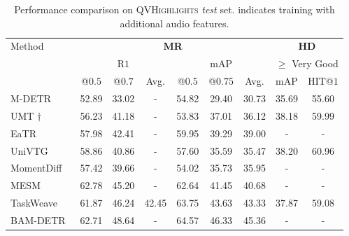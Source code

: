 \begin{table}[t]

\setlength{\tabcolsep}{0.3em}
\centering

\caption{Performance comparison on \textsc{QVHighlights} \textit{test} set. {\dag} indicates training with additional audio features.
}

\begin{small}
\setlength{\tabcolsep}{2pt}

\resizebox{\linewidth}{!}
{

    \begin{tabular}{
         l  c c c  c c c  c c
    }

    
    \toprule
    

\multirow{3}{*}{Method} & \multicolumn{6}{c}{\textbf{MR}}  & \multicolumn{2}{c}{\textbf{HD}} \\

\cmidrule(l){2-7} \cmidrule(l){8-9}

& \multicolumn{3}{c}{R$1$}  & \multicolumn{3}{c}{mAP} & \multicolumn{2}{c}{$\geq$ Very Good} \\

\cmidrule(l){2-4} \cmidrule(l){5-7} \cmidrule(l){8-9}

 & @$0.5$ & @$0.7$ & Avg. & @$0.5$ & @$0.75$ & Avg. & mAP & HIT@$1$ \\

    \midrule

M-DETR~\cite{lei2021detecting_Moment-DETR}	 & 52.89	 & 33.02	& -	 & 54.82	 & 29.40	 & 30.73	 & 35.69	 & 55.60	\\
UMT $\dagger$~\cite{liu2022umt_Umt}	 & 56.23	 & 41.18	& -	 & 53.83	 & 37.01	 & 36.12	 & 38.18	 & 59.99	\\
EaTR~\cite{jang2023knowing_EaTR}	 & 57.98	 & 42.41	& -	 & 59.95	 & 39.29	 & 39.00	& -	& -	\\
UniVTG~\cite{lin2023univtg_Univtg}	 & 58.86	 & 40.86	& -	 & 57.60	 & 35.59	 & 35.47	 & 38.20	 & 60.96	\\
MomentDiff~\cite{li2024momentdiff_momentdiff}	 & 57.42	 & 39.66	& -	 & 54.02	 & 35.73	 & 35.95	& -	& -	\\
MESM~\cite{liu2024towards_MESM}	 & 62.78	 & 45.20	& -	 & 62.64	 & 41.45	 & 40.68	& -	& -	\\
TaskWeave~\cite{zhang2024temporally_TaskWeave}	 & 61.87	 & 46.24	 & 42.45	 & 63.75	 & 43.63	 & 43.33	 & 37.87	 & 59.08	\\
BAM-DETR~\cite{lee2025bam-detr}	 & 62.71	 & 48.64	& -	 & 64.57	 & 46.33	 & 45.36	& -	& -	\\


\end{tabular}}
\end{small}
\end{table}
